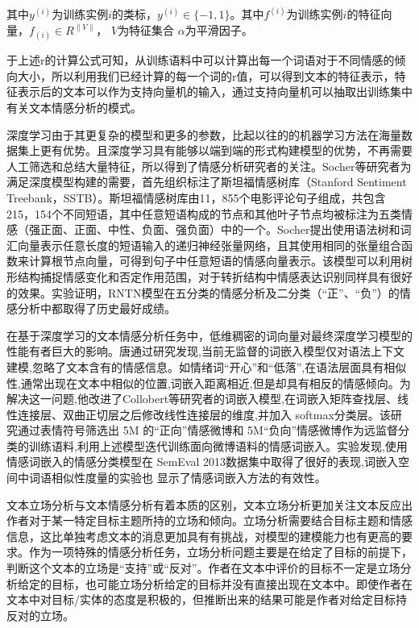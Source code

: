 其中$y^{(i)}$为训练实例$i$的类标，$y^{(i)}\in\lbrace-1,1\rbrace$。其中$f^{(i)}$为训练实例$i$的特征向量，$f_{(i)}\in R^{\|V\|}$， $V$为特征集合 $\alpha$为平滑因子。

于上述r的计算公式可知，从训练语料中可以计算出每一个词语对于不同情感的倾向大小，所以利用我们已经计算的每一个词的r值，可以得到文本的特征表示，特征表示后的文本可以作为支持向量机的输入，通过支持向量机可以抽取出训练集中有关文本情感分析的模式。


深度学习由于其更复杂的模型和更多的参数，比起以往的的机器学习方法在海量数据集上更有优势。且深度学习具有能够以端到端的形式构建模型的优势，不再需要人工筛选和总结大量特征，所以得到了情感分析研究者的关注。Socher等研究者为满足深度模型构建的需要，首先组织标注了斯坦福情感树库（Stanford Sentiment Treebank，SSTB）。斯坦福情感树库由11，855个电影评论句子组成，共包含215，154个不同短语，其中任意短语构成的节点和其他叶子节点均被标注为五类情感（强正面、正面、中性、负面、强负面）中的一个。Socher提出使用语法树和词汇向量表示任意长度的短语输入的递归神经张量网络，且其使用相同的张量组合函数来计算根节点向量，可得到句子中任意短语的情感向量表示。该模型可以利用树形结构捕捉情感变化和否定作用范围，对于转折结构中情感表达识别同样具有很好的效果。实验证明，RNTN模型在五分类的情感分析及二分类（“正”、“负”）的情感分析中都取得了历史最好成绩。


在基于深度学习的文本情感分析任务中，低维稠密的词向量对最终深度学习模型的性能有者巨大的影响。唐通过研究发现,当前无监督的词嵌入模型仅对语法上下文建模,忽略了文本含有的情感信息。如情绪词“开心”和“低落”,在语法层面具有相似性,通常出现在文本中相似的位置,词嵌入距离相近,但是却具有相反的情感倾向。为解决这一问题,他改进了Collobert等研究者的词嵌入模型,在词嵌入矩阵查找层、线性连接层、双曲正切层之后修改线性连接层的维度,并加入 softmax分类层。该研究通过表情符号筛选出 5M 的“正向”情感微博和 5M“负向”情感微博作为远监督分类的训练语料,利用上述模型迭代训练面向微博语料的情感词嵌入。实验发现,使用情感词嵌入的情感分类模型在 SemEval 2013数据集中取得了很好的表现,词嵌入空间中词语相似性度量的实验也 显示了情感词嵌入方法的有效性。

文本立场分析与文本情感分析有着本质的区别，文本立场分析更加关注文本反应出作者对于某一特定目标主题所持的立场和倾向。立场分析需要结合目标主题和情感信息，这比单独考虑文本的消息更加具有有挑战，对模型的建模能力也有更高的要求。作为一项特殊的情感分析任务，立场分析问题主要是在给定了目标的前提下，判断这个文本的立场是“支持”或“反对”。作者在文本中评价的目标不一定是立场分析给定的目标，也可能立场分析给定的目标并没有直接出现在文本中。即使作者在文本中对目标/实体的态度是积极的，但推断出来的结果可能是作者对给定目标持反对的立场。


